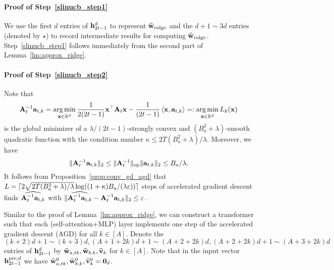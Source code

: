 \paragraph{Proof of Step~\ref{slinucb_step1}} We use the first $d$ entries of ${\mathbf h}_{2t-1}^{{d}}$ to represent $\widehat{{\mathbf w}}_{{\rm ridge}}$ and the $d+1\sim 3d$ entries (denoted by $\star$) to record intermediate results for computing $\widehat{{\mathbf w}}_{{\rm ridge}}$. Step~\ref{slinucb_step1} follows immediately from the second part of Lemma~\ref{lm:approx_ridge}. 

\paragraph{Proof of Step~\ref{slinucb_step2}}
Note that $${\mathbf A}_{t}^{-1}{\mathbf a}_{t,k}=\operatorname*{arg\,min}_{{\mathbf x}\in\mathbb{R}^d}\frac{1}{2(2t-1)}{\mathbf x}^\top{\mathbf A}_t{\mathbf x}-\frac{1}{(2t-1)}\left\langle{\mathbf x},{\mathbf a}_{t,k}\right\rangle=:\operatorname*{arg\,min}_{{\mathbf x}\in\mathbb{R}^d}L_k({\mathbf x})$$ is the global minimizer of a $\lambda/(2t-1)$-strongly convex  and $(B_a^2+\lambda)$-smooth  quadratic function with the condition number $\kappa\leq 2T(B_a^2+\lambda)/\lambda$. Moreover, we have $$\|{\mathbf A}_{t}^{-1}{\mathbf a}_{t,k}\|_2\leq \|{{\mathbf A}_{t}^{-1}}\|_{\mathrm{op}}\|{\mathbf a}_{t,k}\|_2\leq B_a/\lambda.$$ It follows from  Proposition~\ref{prop:conv_gd_agd} that $L=\lceil2\sqrt{2 T(B_a^2+\lambda)/\lambda}\log((1+\kappa)B_a/(\lambda\varepsilon))\rceil$ steps of accelerated gradient descent finds $\widehat{{\mathbf A}_{t}^{-1}{\mathbf a}_{t,k}}$   with $\|\widehat{{\mathbf A}_{t}^{-1}{\mathbf a}_{t,k}}-{\mathbf A}_{t}^{-1}{\mathbf a}_{t,k}\|_2\leq\varepsilon$. 

Similar to the proof of Lemma~\ref{lm:approx_ridge}, we can construct a transformer such that each (self-attention+MLP) layer implements one step of the accelerated gradient descent (AGD) for all $k\in[A]$. Denote the $(k+2)d+1\sim (k+3)d, (A+1+2k)d+1\sim (A+2+2k)d, (A+2+2k)d+1\sim (A+3+2k)d$ entries of  ${\mathbf h}_{2t-1}^{{d}}$ by $\widehat{{\mathbf w}}_{a,tk},\widehat{{\mathbf w}}_{b,k},\widehat{{\mathbf v}}_{k}$ for $k\in[A]$. Note that in the input vector ${\mathbf h}_{2t-1}^{{\mathrm{pre}},{d}}$ we have $\widehat{{\mathbf w}}^0_{a,tk},\widehat{{\mathbf w}}^0_{b,k},\widehat{{\mathbf v}}^0_{k}={\mathbf 0}_d$.

